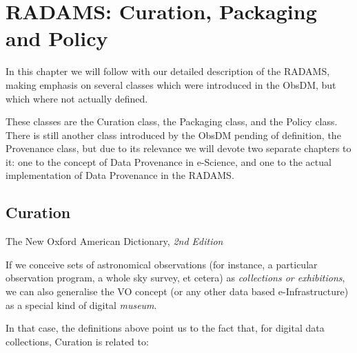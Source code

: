 \chapter{RADAMS: Curation, Packaging and Policy} %
\label{cha:radams_curation_packaging_and_policy}
	
	In this chapter we will follow with our detailed description
	of the RA\-DAMS, making emphasis on several classes which were
	introduced in the ObsDM, but which where not actually defined.
	
	These classes are the Curation class, the Packaging class,
	and the Policy class. There is still another class introduced
	by the ObsDM pending of definition, the Provenance class,
	but due to its relevance we will devote two separate chapters
	to it: one to the concept of Data Provenance in e-Science,
	and one to the actual implementation of Data Provenance in
	the RADAMS.
	
	\section{Curation} %
	\label{sec:curation}
		
		{The New  Oxford American Dictionary, \emph{2nd Edition}}
		
		\noindent If we conceive sets of astronomical observations
		(for instance, a particular observation program, a whole
		sky survey, et cetera) as \emph{collections \emph{or}
		exhibitions}, we can also generalise the VO concept (or any
		other data based e-Infrastructure) as a special kind of
		digital \emph{museum}.
		
		In that case, the definitions above point us to the fact
		that, for digital data collections, Curation is related to:
		
